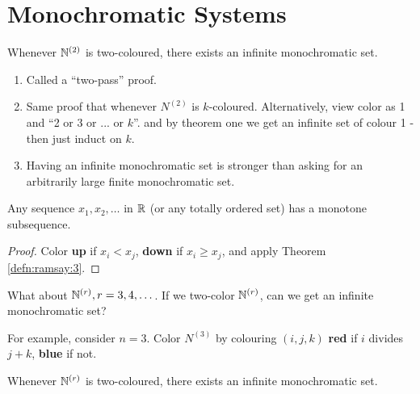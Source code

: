 \chapter{Monochromatic Systems}
\label{cha:monochr-syst}

\begin{thm}
  \label{defn:ramsay:3}
  Whenever $\mathbb{N}^{(2)}$ is two-coloured, there exists an infinite
  monochromatic set.
\end{thm}

\begin{enumerate}
\item Called a ``two-pass'' proof.
\item Same proof that whenever $N^{(2)}$ is $k$-coloured.
  Alternatively, view color as 1 and ``2 or 3 or ... or $k$''.   and
  by theorem one we get an infinite set of colour 1 - then just induct
  on $k$.
\item Having an infinite monochromatic set is stronger than asking for
  an arbitrarily large finite monochromatic set.
\end{enumerate}

\begin{exmp}
  \label{defn:ramsay:1}
  Any sequence $x_{1}, x_{2}, \dots$ in $\mathbb{R}$ (or any totally ordered
  set) has a monotone subsequence.
\end{exmp}

\begin{proof}
  Color \textbf{up} if $x_{i} < x_{j}$, \textbf{down} if $x_{i} \geq
  x_{j}$, and apply Theorem \ref{defn:ramsay:3}. 
\end{proof}

What about $\mathbb{N}^{(r)}, r = 3, 4, \dots$.  If we two-color $\mathbb{N}^{(r)}$,
can we get an infinite monochromatic set?

For example, consider $n=3$.  Color $N^{(3)}$ by colouring $(i,j,k)$
\textbf{red} if $i$ divides $j + k$, \textbf{blue} if not.

\begin{thm}
  \label{defn:ramsay:2}
  Whenever $\mathbb{N}^{(r)}$ is two-coloured, there exists an infinite
  monochromatic set.
\end{thm}

